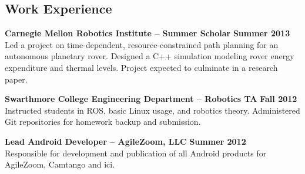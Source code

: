 \documentclass[line]{resume}
\begin{document}
\begin{resume}

\section{\mysidestyle Work Experience}
\textbf{Carnegie Mellon Robotics Institute -- Summer Scholar} \hfill \textbf{Summer 2013}\vspace{0.5mm}\\
Led a project on time-dependent, resource-constrained path planning for an autonomous planetary rover. Designed a C++ simulation modeling rover energy expenditure and thermal levels. Project expected to culminate in a research paper.

\textbf{Swarthmore College Engineering Department -- Robotics TA} \hfill \textbf{Fall 2012}\vspace{0.5mm}\\
Instructed students in ROS, basic Linux usage, and robotics theory. Administered Git repositories for homework backup and submission.

\textbf{Lead Android Developer -- AgileZoom, LLC} \hfill \textbf{Summer 2012}\vspace{0.5mm}\\
Responsible for development and publication of all Android products for AgileZoom, Camtango and ici.



\end{resume}
\end{document}
